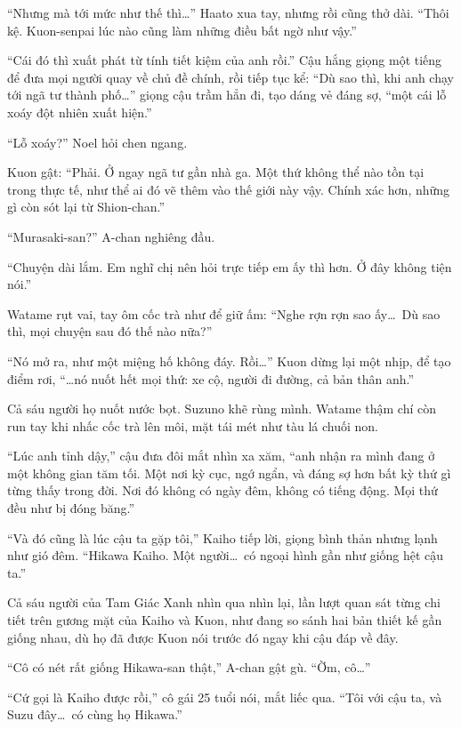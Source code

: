 \documentclass[../main.tex]{subfiles}
\begin{document}
``Nhưng mà tới mức như thế thì\dots'' Haato xua tay, nhưng rồi cũng thở dài. ``Thôi kệ. Kuon-senpai lúc nào cũng làm những điều bất ngờ như vậy.''

``Cái đó thì xuất phát từ tính tiết kiệm của anh rồi.'' Cậu hắng giọng một tiếng để đưa mọi người quay về chủ đề chính, rồi tiếp tục kể: ``Dù sao thì, khi anh chạy tới ngã tư thành phố\dots'' giọng cậu trầm hẳn đi, tạo dáng vẻ đáng sợ, ``một cái lỗ xoáy đột nhiên xuất hiện.''

``Lỗ xoáy?'' Noel hỏi chen ngang.

Kuon gật: ``Phải. Ở ngay ngã tư gần nhà ga. Một thứ không thể nào tồn tại trong thực tế, như thể ai đó vẽ thêm vào thế giới này vậy. Chính xác hơn, những gì còn sót lại từ Shion-chan.''

``Murasaki-san?'' A-chan nghiêng đầu.

``Chuyện dài lắm. Em nghĩ chị nên hỏi trực tiếp em ấy thì hơn. Ở đây không tiện nói.''

Watame rụt vai, tay ôm cốc trà như để giữ ấm: ``Nghe rợn rợn sao ấy\dots\ Dù sao thì, mọi chuyện sau đó thế nào nữa?''

``Nó mở ra, như một miệng hố không đáy. Rồi\dots'' Kuon dừng lại một nhịp, để tạo điểm rơi, ``\dots nó nuốt hết mọi thứ: xe cộ, người đi đường, cả bản thân anh.''

Cả sáu người họ nuốt nước bọt. Suzuno khẽ rùng mình. Watame thậm chí còn run tay khi nhấc cốc trà lên môi, mặt tái mét như tàu lá chuối non.

``Lúc anh tỉnh dậy,'' cậu đưa đôi mắt nhìn xa xăm, ``anh nhận ra mình đang ở một không gian tăm tối. Một nơi kỳ cục, ngớ ngẩn, và đáng sợ hơn bất kỳ thứ gì từng thấy trong đời. Nơi đó không có ngày đêm, không có tiếng động. Mọi thứ đều như bị đóng băng.''

``Và đó cũng là lúc cậu ta gặp tôi,'' Kaiho tiếp lời, giọng bình thản nhưng lạnh như gió đêm. ``Hikawa Kaiho. Một người\dots\ có ngoại hình gần như giống hệt cậu ta.''

Cả sáu người của Tam Giác Xanh nhìn qua nhìn lại, lần lượt quan sát từng chi tiết trên gương mặt của Kaiho và Kuon, như đang so sánh hai bản thiết kế gần giống nhau, dù họ đã được Kuon nói trước đó ngay khi cậu đáp về đây.

``Cô có nét rất giống Hikawa-san thật,'' A-chan gật gù. ``Ờm, cô\dots''

``Cứ gọi là Kaiho được rồi,'' cô gái 25 tuổi nói, mắt liếc qua. ``Tôi với cậu ta, và Suzu đây\dots\ có cùng họ Hikawa.''
\end{document}

